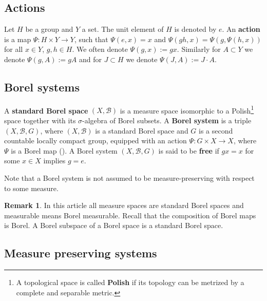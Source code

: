 \documentclass[11pt]{article}
\theoremstyle{plain}
\theoremstyle{definition}
\newtheorem{rem}[thm]{Remark}
\numberwithin{figure}{section}
\begin{document}
\subsection{Actions}
Let $H$ be a group and $Y$ a set. The unit element of $H$ is denoted by $e$. An \textbf{action} is a map $\Psi:H\times Y\rightarrow Y$, such that $\Psi(e,x)=x$ and $\Psi(gh,x)=\Psi(g,\Psi(h,x))$ for all $x\in Y$, $g,h \in H$. We often denote $\Psi(g,x):= gx$. Similarly  for $A\subset Y$ we denote $\Psi(g,A):=gA$ and for $J\subset H$ we denote $\Psi(J,A):=J\cdot A$. 

\subsection{Borel systems}
 A \textbf{standard Borel space} $(X,\mathcal{B})$
is a measure space isomorphic to a Polish\footnote{A topological space is called \textbf{Polish} if its topology can be metrized by a complete and separable metric.} space  together with its $\sigma$-algebra of Borel subsets.
A \textbf{Borel system} is a triple  $(X,\mathcal{B}, G)$, where $(X,\mathcal{B})$ is a  standard Borel space and $G$ is a second countable locally compact group, equipped with an 
action $\Psi:G\times X\rightarrow X$, where $\Psi$  is a Borel map (\cite[\S 2.1]{BK96}).  A Borel system $(X,\mathcal{B}, G)$ is said to
be \textbf{free} if $gx=x$ for some $x\in X$ implies $g=e$.

Note that a Borel system  is not assumed to be measure-preserving with respect to some measure.

\begin{rem}
    In this article all measure spaces are standard Borel spaces and measurable means Borel measurable. Recall that the composition of Borel maps is Borel. A Borel subspace of a  Borel space is a standard Borel space. 
\end{rem}

\subsection{Measure preserving systems}\label{subsec:Measure preserving systems}
\end{document}
